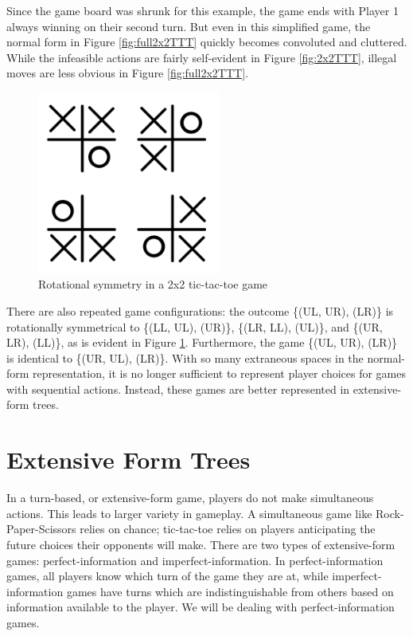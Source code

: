 Since the game board was shrunk for this example, the game ends with Player 1 always winning on their second turn. But even in this simplified game, the normal form in Figure \ref{fig:full2x2TTT} quickly becomes convoluted and cluttered. While the infeasible actions are fairly self-evident in Figure \ref{fig:2x2TTT}, illegal moves are less obvious in Figure \ref{fig:full2x2TTT}.
\begin{figure}[H]
  \centering
  \includegraphics[width=6cm]{figures/TTTRotation.png}
  \caption{Rotational symmetry in a 2x2 tic-tac-toe game}
  \label{fig:2x2TTTRotation}
\end{figure}
There are also repeated game configurations: the outcome \{(UL, UR), (LR)\} is rotationally symmetrical to \{(LL, UL), (UR)\}, \{(LR, LL), (UL)\}, and \{(UR, LR), (LL)\}, as is evident in Figure \ref{fig:2x2TTTRotation}. Furthermore, the game \{(UL, UR), (LR)\} is identical to \{(UR, UL), (LR)\}. With so many extraneous spaces in the normal-form representation, it is no longer sufficient to represent player choices for games with sequential actions. Instead, these games are better represented in extensive-form trees.\\

\section{Extensive Form Trees}
In a turn-based, or extensive-form game, players do not make simultaneous actions. This leads to larger variety in gameplay. A simultaneous game like Rock-Paper-Scissors relies on chance; tic-tac-toe relies on players anticipating the future choices their opponents will make. There are two types of extensive-form games: perfect-information and imperfect-information. In perfect-information games, all players know which turn of the game they are at, while imperfect-information games have turns which are indistinguishable from others based on information available to the player. We will be dealing with perfect-information games.\\

